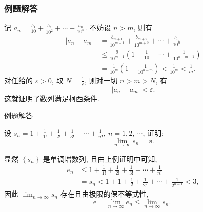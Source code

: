 \documentclass[mathserif]{beamer}
\begin{document}

\begin{frame}[label=li_7jd]
\frametitle{例题解答\hfill \hyperlink{li_7<1>}{}}
\begin{proofs}
	\suojin 记 $a_n=\frac{b_1}{10}+\frac{b_2}{10^2}+\cdots+\frac{b_n}{10^n}$. 不妨设 $n>m$, 则有
	$$
	\begin{aligned}
		\left|a_n-a_m\right| & =\frac{b_{m+1}}{10^{m+1}}+\frac{b_{m+2}}{10^{m+2}}+\cdots+\frac{b_n}{10^n} \\
		& \leqslant \frac{9}{10^{m+1}}\left(1+\frac{1}{10}+\cdots+\frac{1}{10^{n-m-1}}\right) \\
		& =\frac{1}{10^m}\left(1-\frac{1}{10^{n-m}}\right)<\frac{1}{10^m}<\frac{1}{m} .
	\end{aligned}
	$$
	对任给的 $\varepsilon>0$, 取 $N=\frac{1}{\varepsilon}$, 则对一切 $n>m>N$, 有
	$$
	\left|a_n-a_m\right|<\varepsilon .
	$$
	这就证明了数列满足柯西条件.
\end{proofs}
\end{frame}









\begin{frame}[label=li_bc3jd]{例题解答\hfill\hyperlink{li_bc3<1>}{}}%
	\begin{ex}
		\suojin 设 $s_n=1+\frac{1}{1 !}+\frac{1}{2 !}+\frac{1}{3 !}+\cdots+\frac{1}{n !},\ n=1,2,\ \cdots$, 证明:
		$$
		\lim _{n \rightarrow \infty} s_n=\ee .
		$$ 
	\end{ex}
	\begin{proofs}
		\suojin  显然 $\left\{s_n\right\}$ 是单调增数列, 且由上例证明中可知,
		$$
		\begin{aligned}
			e_n & \leqslant 1+\frac{1}{1 !}+\frac{1}{2 !}+\frac{1}{3 !}+\cdots+\frac{1}{n !} \\
			& =s_n<1+1+\frac{1}{2}+\frac{1}{2^2}+\cdots+\frac{1}{2^{n-1}}<3,
		\end{aligned}
		$$
		因此 $\lim _{n \rightarrow \infty} s_n$ 存在且由极限的保不等式性,
		$$
		\mathrm{e}=\lim _{n \rightarrow \infty} e_n \leqslant \lim _{n \rightarrow \infty} s_n \text {. }
		$$ 
	\end{proofs} 
\end{frame}
\end{document}
